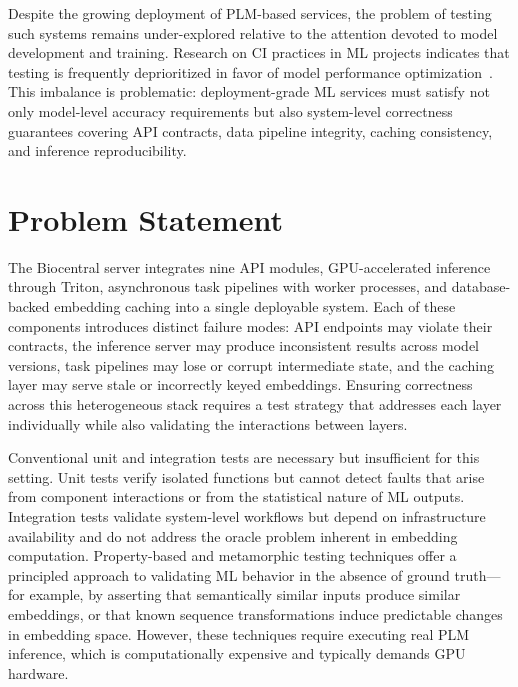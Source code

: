 Despite the growing deployment of \ac{PLM}-based services, the problem of testing such systems remains under-explored relative to the attention devoted to model development and training. Research on \ac{CI} practices in \ac{ML} projects indicates that testing is frequently deprioritized in favor of model performance optimization~\cite{bernardo2025continuousintegrationpracticesmachine, rzig2025empiricalanalysiscicdpipeline}. This imbalance is problematic: deployment-grade \ac{ML} services must satisfy not only model-level accuracy requirements but also system-level correctness guarantees covering \ac{API} contracts, data pipeline integrity, caching consistency, and inference reproducibility.

\section{Problem Statement}\label{sec:problem-statement}

The Biocentral server integrates nine \ac{API} modules, \ac{GPU}-accelerated inference through Triton, asynchronous task pipelines with worker processes, and database-backed embedding caching into a single deployable system. Each of these components introduces distinct failure modes: \ac{API} endpoints may violate their contracts, the inference server may produce inconsistent results across model versions, task pipelines may lose or corrupt intermediate state, and the caching layer may serve stale or incorrectly keyed embeddings. Ensuring correctness across this heterogeneous stack requires a test strategy that addresses each layer individually while also validating the interactions between layers.

Conventional unit and integration tests are necessary but insufficient for this setting. Unit tests verify isolated functions but cannot detect faults that arise from component interactions or from the statistical nature of \ac{ML} outputs. Integration tests validate system-level workflows but depend on infrastructure availability and do not address the oracle problem inherent in embedding computation. Property-based and metamorphic testing techniques offer a principled approach to validating \ac{ML} behavior in the absence of ground truth---for example, by asserting that semantically similar inputs produce similar embeddings, or that known sequence transformations induce predictable changes in embedding space. However, these techniques require executing real \ac{PLM} inference, which is computationally expensive and typically demands \ac{GPU} hardware.

